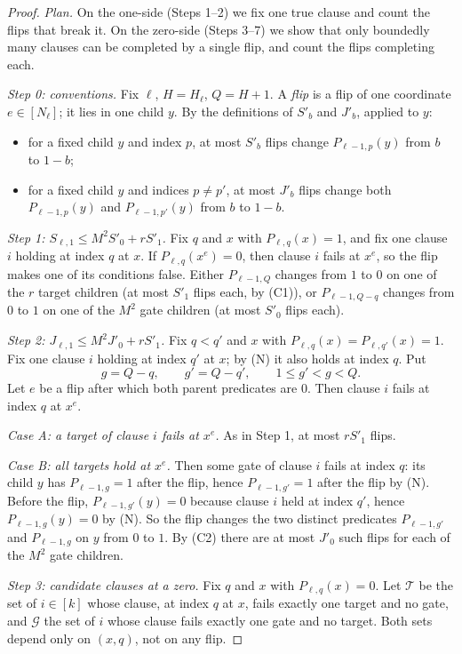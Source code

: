 \documentclass[11pt]{article}
\theoremstyle{definition}
\theoremstyle{remark}
\begin{document}
\begin{proof}
\emph{Plan.} On the one-side (Steps 1--2) we fix one true clause and count
the flips that break it. On the zero-side (Steps 3--7) we show that only
boundedly many clauses can be completed by a single flip, and count the
flips completing each.

\emph{Step 0: conventions.} Fix $\ell$, $H=H_\ell$, $Q=H+1$. A \emph{flip} is
a flip of one coordinate $e\in[N_\ell]$; it lies in one child $y$. By the
definitions of $S'_b$ and $J'_b$, applied to $y$:
\begin{itemize}[nosep]
\item[(C1)] for a fixed child $y$ and index $p$, at most $S'_b$ flips change
$P_{\ell-1,p}(y)$ from $b$ to $1-b$;
\item[(C2)] for a fixed child $y$ and indices $p\ne p'$, at most $J'_b$ flips
change both $P_{\ell-1,p}(y)$ and $P_{\ell-1,p'}(y)$ from $b$ to $1-b$.
\end{itemize}

\emph{Step 1: $S_{\ell,1}\le M^2S'_0+rS'_1$.}
Fix $q$ and $x$ with $P_{\ell,q}(x)=1$, and fix one clause $i$ holding at
index $q$ at $x$. If $P_{\ell,q}(x^e)=0$, then clause $i$ fails at $x^e$, so
the flip makes one of its conditions false. Either $P_{\ell-1,Q}$ changes
from $1$ to $0$ on one of the $r$ target children (at most $S'_1$ flips each,
by (C1)), or $P_{\ell-1,Q-q}$ changes from $0$ to $1$ on one of the $M^2$
gate children (at most $S'_0$ flips each).

\emph{Step 2: $J_{\ell,1}\le M^2J'_0+rS'_1$.}
Fix $q<q'$ and $x$ with $P_{\ell,q}(x)=P_{\ell,q'}(x)=1$. Fix one clause $i$
holding at index $q'$ at $x$; by (N) it also holds at index $q$. Put
\[
 g=Q-q,\qquad g'=Q-q',\qquad 1\le g'<g<Q.
\]
Let $e$ be a flip after which both parent predicates are $0$. Then clause $i$
fails at index $q$ at $x^e$.

\emph{Case A: a target of clause $i$ fails at $x^e$.} As in Step 1, at most
$rS'_1$ flips.

\emph{Case B: all targets hold at $x^e$.} Then some gate of clause $i$ fails
at index $q$: its child $y$ has $P_{\ell-1,g}=1$ after the flip, hence
$P_{\ell-1,g'}=1$ after the flip by (N). Before the flip, $P_{\ell-1,g'}(y)=0$
because clause $i$ held at index $q'$, hence $P_{\ell-1,g}(y)=0$ by (N). So
the flip changes the two distinct predicates $P_{\ell-1,g'}$ and
$P_{\ell-1,g}$ on $y$ from $0$ to $1$. By (C2) there are at most $J'_0$ such
flips for each of the $M^2$ gate children.

\emph{Step 3: candidate clauses at a zero.}
Fix $q$ and $x$ with $P_{\ell,q}(x)=0$. Let $\mathcal T$ be the set of
$i\in[k]$ whose clause, at index $q$ at $x$, fails exactly one target and no
gate, and $\mathcal G$ the set of $i$ whose clause fails exactly one gate
and no target. Both sets depend only on $(x,q)$, not on any flip.


\end{proof}
\end{document}
